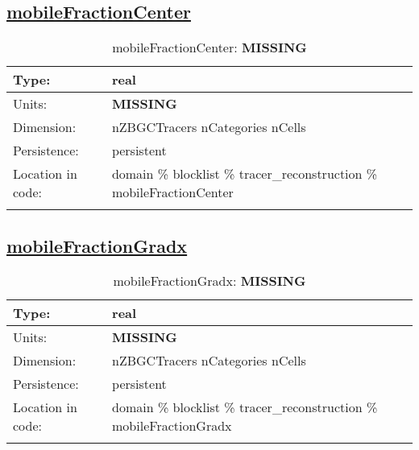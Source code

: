 \subsection[mobileFractionCenter]{\hyperref[sec:var_tab_tracer_reconstruction]{mobileFractionCenter}}
\label{subsec:var_sec_tracer_reconstruction_mobileFractionCenter}
\begin{center}
\begin{longtable}{| p{2.0in} | p{4.0in} |}
        \hline 
        Type: & real \\
        \hline 
        Units: & {\bf \color{red} MISSING} \\
        \hline 
        Dimension: & nZBGCTracers nCategories nCells \\
        \hline 
        Persistence: & persistent \\
        \hline 
         Location in code: & domain \% blocklist \% tracer\_reconstruction \% mobileFractionCenter \\
         \hline 
    \caption{mobileFractionCenter: {\bf \color{red} MISSING}}
\end{longtable}
\end{center}
\subsection[mobileFractionGradx]{\hyperref[sec:var_tab_tracer_reconstruction]{mobileFractionGradx}}
\label{subsec:var_sec_tracer_reconstruction_mobileFractionGradx}
\begin{center}
\begin{longtable}{| p{2.0in} | p{4.0in} |}
        \hline 
        Type: & real \\
        \hline 
        Units: & {\bf \color{red} MISSING} \\
        \hline 
        Dimension: & nZBGCTracers nCategories nCells \\
        \hline 
        Persistence: & persistent \\
        \hline 
         Location in code: & domain \% blocklist \% tracer\_reconstruction \% mobileFractionGradx \\
         \hline 
    \caption{mobileFractionGradx: {\bf \color{red} MISSING}}
\end{longtable}
\end{center}
